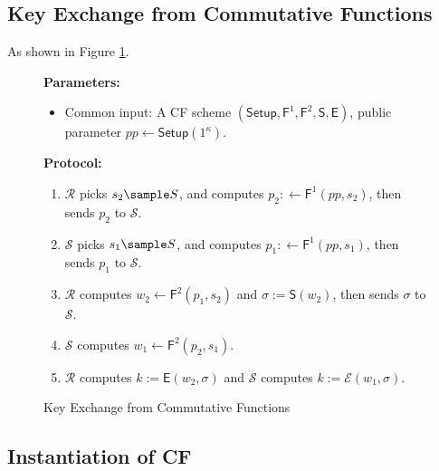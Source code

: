 \subsection{Key Exchange from Commutative Functions}
As shown in Figure \ref{fig:ke-from-commutative-functions}.
\begin{figure}[!hbtp]
\begin{framed}
\begin{minipage}[center]{\textwidth}
\begin{trivlist}
\item \textbf{Parameters:} 
\begin{itemize}
    \item Common input: A CF scheme $(\mathsf{Setup},\mathsf{F}^1,\mathsf{F}^2,\mathsf{S},\mathsf{E})$, public parameter $pp\leftarrow \mathsf{Setup}(1^\kappa)$. 
\end{itemize}

\item \textbf{Protocol:}

\begin{enumerate}
\item $\mathcal{R}$ picks $s_2 \sample S$, and computes $p_2:\leftarrow \mathsf{F}^1(pp,s_2)$, 
    then sends $p_2$ to $\mathcal{S}$. 

\item $\mathcal{S}$ picks $s_1 \sample S$, and computes $p_1:\leftarrow \mathsf{F}^1(pp,s_1)$, 
    then sends $p_1$ to $\mathcal{S}$. 

\item $\mathcal{R}$ computes $w_2\leftarrow \mathsf{F}^2(p_1,s_2)$ and $\sigma:= \mathsf{S}(w_2)$, 
    then sends $\sigma$ to $\mathcal{S}$. 

\item $\mathcal{S}$ computes $w_1\leftarrow \mathsf{F}^2(p_2,s_1)$. 

\item $\mathcal{R}$ computes $k:=\mathsf{E}(w_2,\sigma)$ and $\mathcal{S}$ computes $k:=\mathcal{E}(w_1,\sigma)$.  
\end{enumerate}
\end{trivlist}
\end{minipage}
\end{framed}
\caption{Key Exchange from Commutative Functions}\label{fig:ke-from-commutative-functions}
\end{figure} 
	
\subsection{Instantiation of CF}

